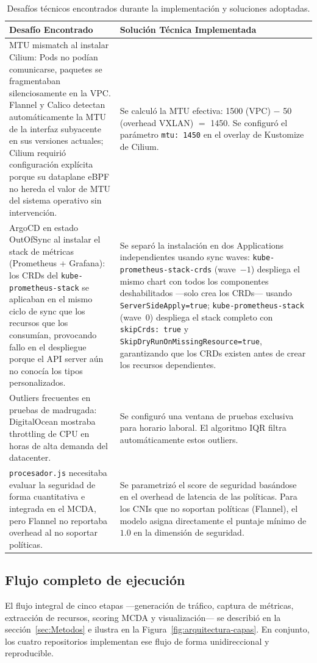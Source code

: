 \begin{table}[htbp]
\centering
\scriptsize
\renewcommand{\arraystretch}{1.25}
\setlength{\tabcolsep}{4pt}
\caption{Desafíos técnicos encontrados durante la implementación y soluciones adoptadas.}
\label{tab:desafios-implementacion}
\begin{tabularx}{\textwidth}{|Y|Y|}
\hline
\textbf{Desafío Encontrado} & \textbf{Solución Técnica Implementada} \\
\hline
MTU mismatch al instalar Cilium: Pods no podían comunicarse, paquetes se fragmentaban silenciosamente en la VPC. Flannel y Calico detectan automáticamente la MTU de la interfaz subyacente en sus versiones actuales; Cilium requirió configuración explícita porque su dataplane eBPF no hereda el valor de MTU del sistema operativo sin intervención. & Se calculó la MTU efectiva: 1500 (VPC) $-$ 50 (overhead VXLAN) $=$ 1450. Se configuró el parámetro \texttt{mtu: 1450} en el overlay de Kustomize de Cilium. \\
\hline
ArgoCD en estado OutOfSync al instalar el stack de métricas (Prometheus + Grafana): los CRDs del \texttt{kube-prometheus-stack} se aplicaban en el mismo ciclo de sync que los recursos que los consumían, provocando fallo en el despliegue porque el API server aún no conocía los tipos personalizados. & Se separó la instalación en dos Applications independientes usando sync waves: \texttt{kube-prometheus-stack-crds} (wave~$-1$) despliega el mismo chart con todos los componentes deshabilitados ---solo crea los CRDs--- usando \texttt{ServerSideApply=true}; \texttt{kube-prometheus-stack} (wave~$0$) despliega el stack completo con \texttt{skipCrds:~true} y \texttt{SkipDryRunOnMissingResource=true}, garantizando que los CRDs existen antes de crear los recursos dependientes. \\
\hline
Outliers frecuentes en pruebas de madrugada: DigitalOcean mostraba throttling de CPU en horas de alta demanda del datacenter. & Se configuró una ventana de pruebas exclusiva para horario laboral. El algoritmo IQR filtra automáticamente estos outliers. \\
\hline
\texttt{procesador.js} necesitaba evaluar la seguridad de forma cuantitativa e integrada en el MCDA, pero Flannel no reportaba overhead al no soportar políticas. & Se parametrizó el score de seguridad basándose en el overhead de latencia de las políticas. Para los CNIs que no soportan políticas (Flannel), el modelo asigna directamente el puntaje mínimo de $1.0$ en la dimensión de seguridad. \\
\hline
\end{tabularx}
\end{table}

\subsection{Flujo completo de ejecución}

El flujo integral de cinco etapas ---generación de tráfico, captura de métricas, extracción de recursos, scoring MCDA y visualización--- se describió en la sección~\ref{sec:Metodos} e ilustra en la Figura~\ref{fig:arquitectura-capas}. En conjunto, los cuatro repositorios implementan ese flujo de forma unidireccional y reproducible.